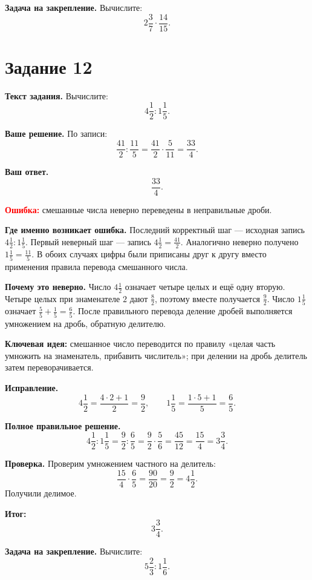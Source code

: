 \documentclass[12pt,a4paper]{article}
\begin{document}
\textbf{Задача на закрепление.}
Вычислите:
\[
2\frac{3}{7}\cdot\frac{14}{15}.
\]

\newpage
{}\label{task:12}
\section*{Задание 12}

\textbf{Текст задания.}
Вычислите:
\[
4\frac{1}{2}:1\frac{1}{5}.
\]

\textbf{Ваше решение.}
По записи:
\[
\frac{41}{2}:\frac{11}{5}
=\frac{41}{2}\cdot\frac{5}{11}
=\frac{33}{4}.
\]

\textbf{Ваш ответ.}
\[
\frac{33}{4}.
\]

\textcolor{red}{\textbf{Ошибка:}} смешанные числа неверно переведены в неправильные дроби.

\textbf{Где именно возникает ошибка.}
Последний корректный шаг --- исходная запись $4\frac12:1\frac15$. Первый неверный шаг --- запись $4\frac12=\frac{41}{2}$. Аналогично неверно получено $1\frac15=\frac{11}{5}$. В обоих случаях цифры были приписаны друг к другу вместо применения правила перевода смешанного числа.

\textbf{Почему это неверно.}
Число $4\frac12$ означает четыре целых и ещё одну вторую. Четыре целых при знаменателе $2$ дают $\frac82$, поэтому вместе получается $\frac92$. Число $1\frac15$ означает $\frac55+\frac15=\frac65$. После правильного перевода деление дробей выполняется умножением на дробь, обратную делителю.

\textcolor{blue!60!black}{\textbf{Ключевая идея:}} смешанное число переводится по правилу «целая часть умножить на знаменатель, прибавить числитель»; при делении на дробь делитель затем переворачивается.

\textbf{Исправление.}
\[
4\frac12=\frac{4\cdot2+1}{2}=\frac92,
\qquad
1\frac15=\frac{1\cdot5+1}{5}=\frac65.
\]

\textbf{Полное правильное решение.}
\[
4\frac12:1\frac15
=\frac92:\frac65
=\frac92\cdot\frac56
=\frac{45}{12}
=\frac{15}{4}
=3\frac34.
\]

\textbf{Проверка.}
Проверим умножением частного на делитель:
\[
\frac{15}{4}\cdot\frac65
=\frac{90}{20}
=\frac92
=4\frac12.
\]
Получили делимое.

\textcolor{teal!60!black}{\textbf{Итог:}}
\[
\boxed{3\frac34}.
\]

\textbf{Задача на закрепление.}
Вычислите:
\[
5\frac{2}{3}:1\frac{1}{6}.
\]
\end{document}
